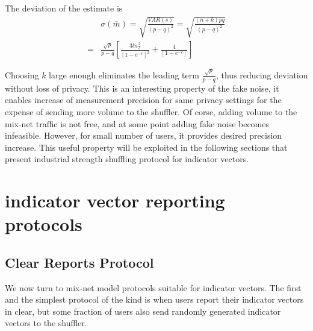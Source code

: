\documentclass[11pt]{article}
\begin{document}
The deviation of the estimate is
\begin{align}
& \sigma(\bar{m}) =  \sqrt { \frac{VAR(s)}{ (p-q)^2}} =  \sqrt {\frac{(n+k)pq}{ (p-q)^2} } \\
= &  \frac{\sqrt{p}}{p-q} \left [ \frac  { 3  ln\frac{2}{\delta}}  {\left [ 1 - e^{-\epsilon}\right ] ^2}  + \frac{4}{\left [ 1 - e^{-\epsilon}\right ] }  \right ] \label{eq:bins}
\end{align}

Choosing $k$ large enough eliminates the leading term  $\frac{\sqrt{p}}{p-q}$, thus reducing deviation without loss of privacy. This is an interesting property of the fake noise, it enables increase of measurement precision for same privacy settings for the expense of sending more volume to the shuffler.  Of corse, adding volume to the mix-net traffic is not free, and at some point adding fake noise becomes infeasible.  However, for small number of users, it provides desired precision increase. This useful property will be exploited in the following sections that present industrial strength shuffling protocol for indicator vectors.

\section{indicator vector reporting protocols}

\subsection{Clear Reports Protocol}

We now turn to mix-net model protocols suitable for indicator vectors. The first and the simplest protocol of the kind is when users report their indicator vectors in clear, but some fraction of users also send randomly generated indicator vectors to the shuffler. 
\end{document}
